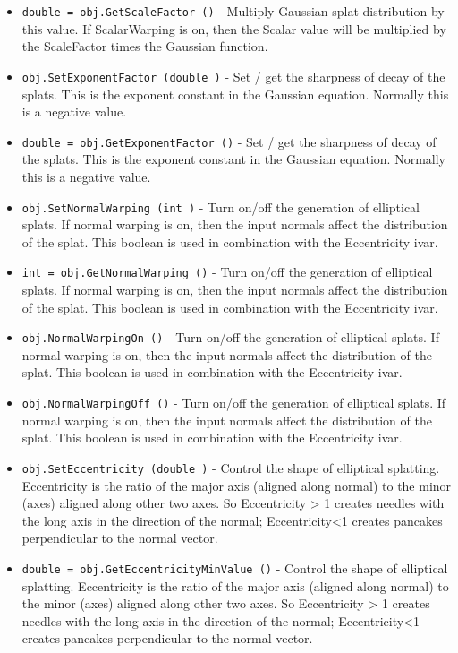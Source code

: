 \begin{itemize}
\item  \verb|double = obj.GetScaleFactor ()| -  Multiply Gaussian splat distribution by this value. If ScalarWarping
 is on, then the Scalar value will be multiplied by the ScaleFactor
 times the Gaussian function.

\item  \verb|obj.SetExponentFactor (double )| -  Set / get the sharpness of decay of the splats. This is the
 exponent constant in the Gaussian equation. Normally this is
 a negative value.

\item  \verb|double = obj.GetExponentFactor ()| -  Set / get the sharpness of decay of the splats. This is the
 exponent constant in the Gaussian equation. Normally this is
 a negative value.

\item  \verb|obj.SetNormalWarping (int )| -  Turn on/off the generation of elliptical splats. If normal warping is
 on, then the input normals affect the distribution of the splat. This
 boolean is used in combination with the Eccentricity ivar.

\item  \verb|int = obj.GetNormalWarping ()| -  Turn on/off the generation of elliptical splats. If normal warping is
 on, then the input normals affect the distribution of the splat. This
 boolean is used in combination with the Eccentricity ivar.

\item  \verb|obj.NormalWarpingOn ()| -  Turn on/off the generation of elliptical splats. If normal warping is
 on, then the input normals affect the distribution of the splat. This
 boolean is used in combination with the Eccentricity ivar.

\item  \verb|obj.NormalWarpingOff ()| -  Turn on/off the generation of elliptical splats. If normal warping is
 on, then the input normals affect the distribution of the splat. This
 boolean is used in combination with the Eccentricity ivar.

\item  \verb|obj.SetEccentricity (double )| -  Control the shape of elliptical splatting. Eccentricity is the ratio
 of the major axis (aligned along normal) to the minor (axes) aligned
 along other two axes. So Eccentricity > 1 creates needles with the
 long axis in the direction of the normal; Eccentricity<1 creates
 pancakes perpendicular to the normal vector.

\item  \verb|double = obj.GetEccentricityMinValue ()| -  Control the shape of elliptical splatting. Eccentricity is the ratio
 of the major axis (aligned along normal) to the minor (axes) aligned
 along other two axes. So Eccentricity > 1 creates needles with the
 long axis in the direction of the normal; Eccentricity<1 creates
 pancakes perpendicular to the normal vector.


\end{itemize}
